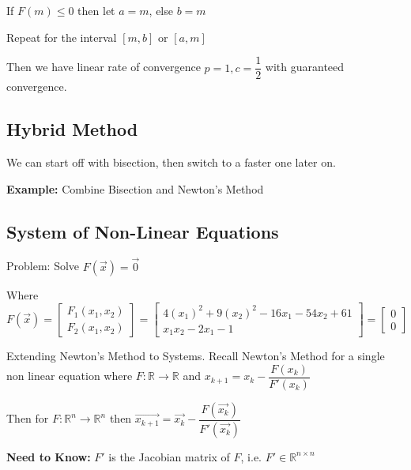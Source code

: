 \documentclass{article}
\begin{document}
\hspace{2cm} If $F(m) \leq 0$ then let $a = m$, else $b = m$ 

\hspace{2cm} Repeat for the interval $[m, b]$ or $[a, m]$

\vspace{0.2cm}

Then we have linear rate of convergence $p = 1, c = \dfrac{1}{2}$ with guaranteed convergence.

\subsection{Hybrid Method}

We can start off with bisection, then switch to a faster one later on.

\textbf{Example:} Combine Bisection and Newton's Method

\subsection{System of Non-Linear Equations}

Problem: Solve $F(\vec{x}) = \vec{0}$

Where $F(\vec{x}) = \begin{bmatrix}
F_1(x_1, x_2)\\
F_2(x_1, x_2)
\end{bmatrix} = \begin{bmatrix}
4(x_1)^2 + 9 (x_2)^2 - 16 x_1 - 54x_2 + 61\\
x_1x_2 - 2x_1 - 1
\end{bmatrix} = \begin{bmatrix}
0\\
0
\end{bmatrix}$

\vspace{0.2cm}

Extending Newton's Method to Systems. Recall Newton's Method for a single non linear equation where $F: \mathbb R \to \mathbb R$
and $x_{k + 1} = x_k - \dfrac{F(x_k)}{F'(x_k)}$

\pagebreak

\text{}

Then for $F: \mathbb R^n \to \mathbb R^n$ then $\vec{x_{k + 1}} = \vec{x_k} - \dfrac{F(\vec{x_k})}{F'(\vec{x_k})}$

\vspace{0.2cm}

\textbf{Need to Know:} $F'$ is the Jacobian matrix of $F$, i.e. $F' \in \mathbb R^{n \times n}$ 
\end{document}
